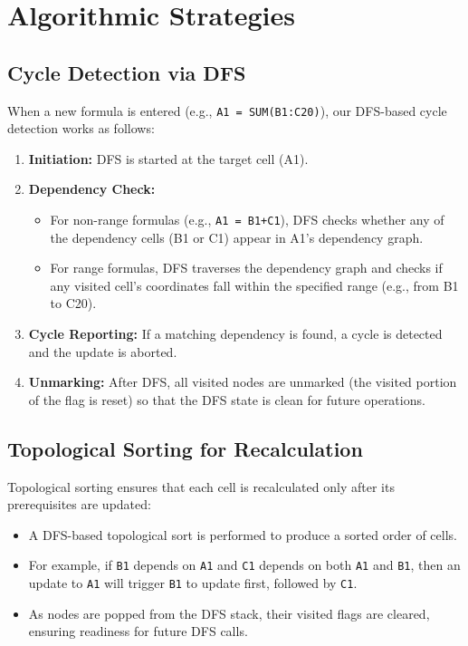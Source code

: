 \documentclass[10pt]{article}
\begin{document}
\section{Algorithmic Strategies}
\subsection{Cycle Detection via DFS}
When a new formula is entered (e.g., \texttt{A1 = SUM(B1:C20)}), our DFS-based cycle detection works as follows:
\begin{enumerate}[noitemsep]
    \item \textbf{Initiation:} DFS is started at the target cell (A1).
    \item \textbf{Dependency Check:} 
    \begin{itemize}[noitemsep]
        \item For non-range formulas (e.g., \texttt{A1 = B1+C1}), DFS checks whether any of the dependency cells (B1 or C1) appear in A1's dependency graph.
        \item For range formulas, DFS traverses the dependency graph and checks if any visited cell’s coordinates fall within the specified range (e.g., from B1 to C20).
    \end{itemize}
    \item \textbf{Cycle Reporting:} If a matching dependency is found, a cycle is detected and the update is aborted.
    \item \textbf{Unmarking:} After DFS, all visited nodes are unmarked (the visited portion of the flag is reset) so that the DFS state is clean for future operations.
\end{enumerate}

\subsection{Topological Sorting for Recalculation}
Topological sorting ensures that each cell is recalculated only after its prerequisites are updated:
\begin{itemize}[noitemsep]
    \item A DFS-based topological sort is performed to produce a sorted order of cells.
    \item For example, if \texttt{B1} depends on \texttt{A1} and \texttt{C1} depends on both \texttt{A1} and \texttt{B1}, then an update to \texttt{A1} will trigger \texttt{B1} to update first, followed by \texttt{C1}.
    \item As nodes are popped from the DFS stack, their visited flags are cleared, ensuring readiness for future DFS calls.
\end{itemize}
\end{document}
